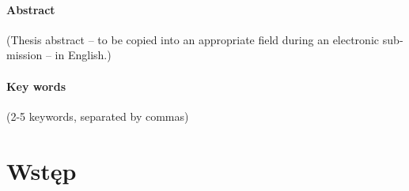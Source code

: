 \documentclass[a4paper,twoside,12pt]{book}
\newcounter{stronyPozaNumeracja}
\begin{document}
	\subsubsection*{Abstract} 
	\begin{otherlanguage}{british}
		(Thesis abstract – to be copied into an appropriate field during an electronic submission – in English.)
	\end{otherlanguage}
	\subsubsection*{Key words}  
	\begin{otherlanguage}{british}
		(2-5 keywords, separated by commas)
	\end{otherlanguage}
	
	
	
	
	\tableofcontents
	
	\setcounter{stronyPozaNumeracja}{\value{page}}
	\mainmatter
	\pagestyle{empty}
	
	\cleardoublepage
	
	\pagestyle{NumeryStronNazwyRozdzialow}
	
	
	\chapter{Wstęp}
	
\end{document}
